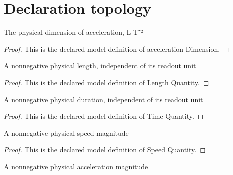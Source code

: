 \section{Declaration topology}
\begin{definition}
  \label{def:physics:phyx-mini-0751:phyxminiproblems-problemphyxmini0751-accelerationdimension}
  The physical dimension of acceleration, L T⁻²
\end{definition}
\begin{proof}
  This is the declared model definition of acceleration Dimension.
\end{proof}
\begin{definition}
  \label{def:physics:phyx-mini-0751:phyxminiproblems-problemphyxmini0751-lengthquantity}
  A nonnegative physical length, independent of its readout unit
\end{definition}
\begin{proof}
  This is the declared model definition of Length Quantity.
\end{proof}
\begin{definition}
  \label{def:physics:phyx-mini-0751:phyxminiproblems-problemphyxmini0751-timequantity}
  A nonnegative physical duration, independent of its readout unit
\end{definition}
\begin{proof}
  This is the declared model definition of Time Quantity.
\end{proof}
\begin{definition}
  \label{def:physics:phyx-mini-0751:phyxminiproblems-problemphyxmini0751-speedquantity}
  A nonnegative physical speed magnitude
\end{definition}
\begin{proof}
  This is the declared model definition of Speed Quantity.
\end{proof}
\begin{definition}
  \label{def:physics:phyx-mini-0751:phyxminiproblems-problemphyxmini0751-accelerationquantity}
  A nonnegative physical acceleration magnitude
\end{definition}
